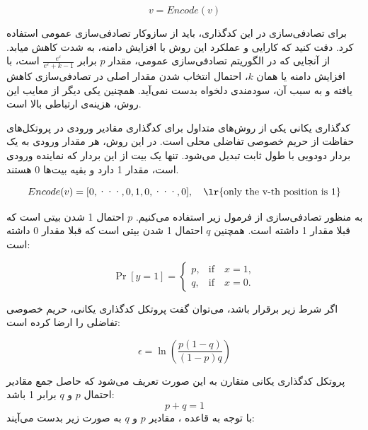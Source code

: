 \begin{equation}
 v = Encode(v)
\end{equation}

برای تصادفی‌سازی در این کدگذاری، باید از سازوکار تصادفی‌سازی عمومی استفاده کرد. دقت کنید که کارایی و عملکرد این روش با افزایش دامنه، به شدت کاهش میابد. از آنجایی که در الگوریتم تصادفی‌سازی عمومی، مقدار $p$ برابر $\frac{e^{\varepsilon}}{e^{\varepsilon}+k-1}$ است، با افزایش دامنه یا همان $k$، احتمال انتخاب شدن مقدار اصلی در تصادفی‌سازی کاهش یافته و به سبب آن، سودمندی دلخواه بدست نمی‌آید. همچنین یکی دیگر از معایب این روش، هزینه‌ی ارتباطی بالا است.


کدگذاری یکانی یکی از روش‌های متداول برای کدگذاری مقادیر ورودی در پروتکل‌های حفاظت از حریم خصوصی تفاضلی محلی است. در این روش، هر مقدار ورودی به یک بردار دودویی با طول ثابت تبدیل می‌شود. تنها یک بیت از این بردار که نماینده ورودی است، مقدار 1 دارد و بقیه بیت‌ها 0 هستند.

\begin{equation}
Encode(v) = [0, \text{···} ,0,1,0, \text{···} , 0], \quad \text{\lr{only the v-th position is 1}}
\end{equation}

به منظور تصادفی‌سازی از فرمول زیر استفاده می‌کنیم. $p$ احتمال 1 شدن بیتی است که قبلا مقدار 1 داشته است. همچنین $q$ احتمال 1 شدن بیتی است که قبلا مقدار 0 داشته است:

\begin{equation}
\Pr[y = 1] =
\begin{cases} 
p, & \text{if} \quad x = 1, \\[10pt]
q, & \text{if} \quad x = 0.
\end{cases}
\end{equation}

اگر شرط زیر برقرار باشد، می‌توان گفت پروتکل کدگذاری یکانی، حریم خصوصی تفاضلی را ارضا کرده است:


\begin{equation}
\epsilon = \ln \left( \frac{p(1 - q)}{(1 - p)q} \right)
\label{equ:unary}
\end{equation}


پروتکل کدگذاری یکانی متقارن به این صورت تعریف می‌شود که حاصل جمع مقادیر احتمال $p$ و $q$ برابر 1 باشد:
$$p + q = 1$$
با توجه به قاعده ، مقادیر $p$ و $q$ به صورت زیر بدست می‌آیند:

